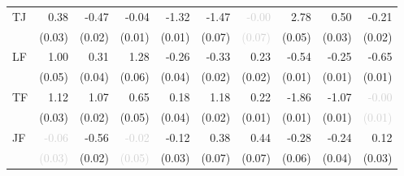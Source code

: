 \begin{tabular}{lrrrrrrrrr}
\multirow{2}{*}{TJ} &0.38 &-0.47 &-0.04 &-1.32 &-1.47 &\cellcolor{Gray}\textcolor{LightGray}{-0.00} &2.78 &0.50 &-0.21\\
 &\tiny{(0.03)} &\tiny{(0.02)} &\tiny{(0.01)} &\tiny{(0.01)} &\tiny{(0.07)} &\cellcolor{Gray}\textcolor{LightGray}{\tiny{(0.07)}} &\tiny{(0.05)} &\tiny{(0.03)} &\tiny{(0.02)}\\[1ex]
\multirow{2}{*}{LF} &1.00 &0.31 &1.28 &-0.26 &-0.33 &0.23 &\cellcolor{Gray}-0.54 &-0.25 &-0.65\\
 &\tiny{(0.05)} &\tiny{(0.04)} &\tiny{(0.06)} &\tiny{(0.04)} &\tiny{(0.02)} &\tiny{(0.02)} &\cellcolor{Gray}\tiny{(0.01)} &\tiny{(0.01)} &\tiny{(0.01)}\\[1ex]
\multirow{2}{*}{TF} &1.12 &1.07 &0.65 &0.18 &1.18 &0.22 &-1.86 &\cellcolor{Gray}-1.07 &\textcolor{LightGray}{-0.00}\\
 &\tiny{(0.03)} &\tiny{(0.02)} &\tiny{(0.05)} &\tiny{(0.04)} &\tiny{(0.02)} &\tiny{(0.01)} &\tiny{(0.01)} &\cellcolor{Gray}\tiny{(0.01)} &\textcolor{LightGray}{\tiny{(0.01)}}\\[1ex]
\multirow{2}{*}{JF} &\textcolor{LightGray}{-0.06} &-0.56 &\textcolor{LightGray}{-0.02} &-0.12 &0.38 &0.44 &-0.28 &-0.24 &\cellcolor{Gray}0.12\\
 &\textcolor{LightGray}{\tiny{(0.03)}} &\tiny{(0.02)} &\textcolor{LightGray}{\tiny{(0.05)}} &\tiny{(0.03)} &\tiny{(0.07)} &\tiny{(0.07)} &\tiny{(0.06)} &\tiny{(0.04)} &\cellcolor{Gray}\tiny{(0.03)}\\[1ex]
\bottomrule
\end{tabular}
